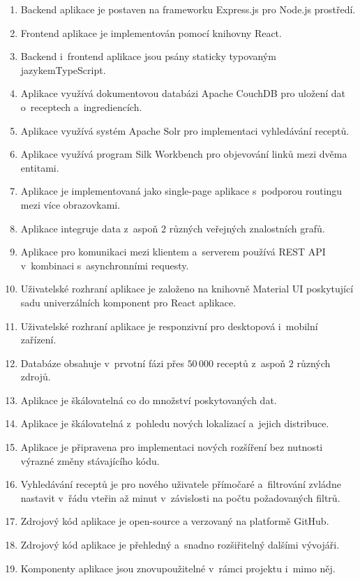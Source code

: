 \begin{enumerate}
    \item Backend aplikace je postaven na frameworku Express.js pro Node.js prostředí.
    \item Frontend aplikace je implementován pomocí knihovny React.
    \item Backend i~frontend aplikace jsou psány staticky typovaným jazykem\newline TypeScript.
    \item Aplikace využívá dokumentovou databázi Apache CouchDB pro uložení dat o~receptech a~ingrediencích.
    \item Aplikace využívá systém Apache Solr pro implementaci vyhledávání receptů.
    \item Aplikace využívá program Silk Workbench pro objevování linků mezi dvěma entitami.
    \item Aplikace je implementovaná jako single-page aplikace s~podporou routingu mezi více obrazovkami.
    \item Aplikace integruje data z~aspoň 2 různých veřejných znalostních grafů.
    \item Aplikace pro komunikaci mezi klientem a~serverem používá REST API v~kombinaci s~asynchronními requesty. 
    \item Uživatelské rozhraní aplikace je založeno na knihovně Material UI poskytující sadu univerzálních komponent pro React aplikace.
    \item Uživatelské rozhraní aplikace je responzivní pro desktopová i~mobilní zařízení.
    \item Databáze obsahuje v~prvotní fázi přes $50\,000$ receptů z~aspoň $2$ různých zdrojů.
    \item Aplikace je škálovatelná co do množství poskytovaných dat.
    \item Aplikace je škálovatelná z~pohledu nových lokalizací a~jejich distribuce.
    \item Aplikace je připravena pro implementaci nových rozšíření bez nutnosti výrazné změny stávajícího kódu.
    \item Vyhledávání receptů je pro nového uživatele přímočaré a~filtrování zvládne nastavit v~řádu vteřin až minut v~závislosti na počtu požadovaných filtrů.
    \item Zdrojový kód aplikace je open-source a verzovaný na platformě GitHub.
    \item Zdrojový kód aplikace je přehledný a~snadno rozšiřitelný dalšími vývojáři.
    \item Komponenty aplikace jsou znovupoužitelné v~rámci projektu i~mimo něj.

\end{enumerate}
